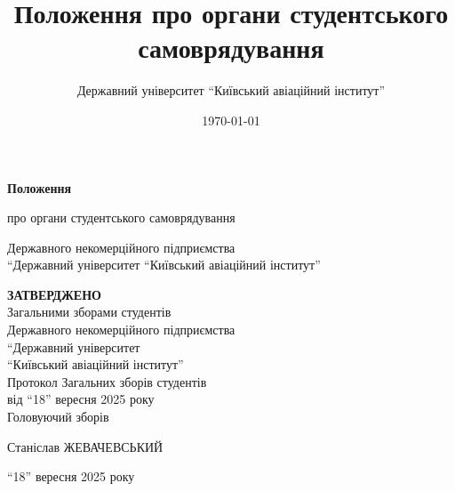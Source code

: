 \documentclass[12pt, a4paper]{article}
\title{Положення про органи студентського самоврядування}
\author{Державний університет ``Київський авіаційний інститут''}
\date{\today} %
\begin{document}
\begin{titlepage}
    \centering
    \vspace*{\fill} %

    {\Huge\bfseries Положення}\par %
    \vspace{1em} %
    {\LARGE про органи студентського самоврядування}\par %
    \vspace{0.5em} %
    {\large Державного некомерційного підприємства \\ ``Державний університет ``Київський авіаційний інститут''}\par %

    \vspace{4cm}

    \begin{flushright}
    \parbox{0.55\textwidth}{\raggedleft\large
        \textbf{ЗАТВЕРДЖЕНО}\\
        Загальними зборами студентів\\
        Державного некомерційного підприємства\\
        ``Державний університет\\
        ``Київський авіаційний інститут''\\
        Протокол Загальних зборів студентів\\
        від ``18'' вересня 2025 року\\
        Головуючий зборів

        Станіслав ЖЕВАЧЕВСЬКИЙ

        ``18'' вересня 2025 року
    }
    \end{flushright}

    \vspace*{\fill} %
\end{titlepage}

\end{document}
